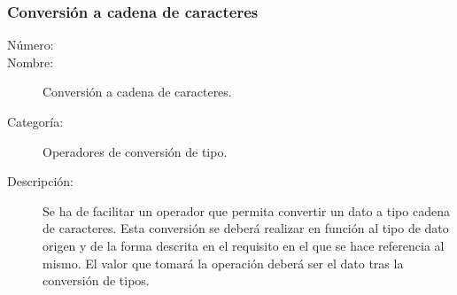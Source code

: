 \subsubsection{Conversión a cadena de caracteres}
\begin{framed}
	\begin{description}
		\item [Número:] \cn
		\item [Nombre:] Conversión a cadena de caracteres.
		\item [Categoría:] Operadores de conversión de tipo.
		\item [Descripción:] Se ha de facilitar un operador que permita convertir un dato a tipo cadena de caracteres. Esta conversión
		se deberá realizar en función al tipo de dato origen y de la forma descrita en el requisito en el que se hace referencia al mismo.
		El valor que tomará la operación deberá ser el dato tras la conversión de tipos.
	\end {description}
\end{framed}
